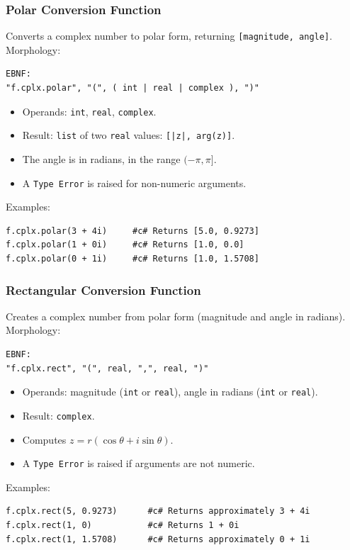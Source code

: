 \subsubsection{Polar Conversion Function}
Converts a complex number to polar form, returning \texttt{[magnitude, angle]}. \\
Morphology:
\begin{verbatim}
EBNF:
"f.cplx.polar", "(", ( int | real | complex ), ")"
\end{verbatim}
\begin{itemize}
\item Operands: \texttt{int}, \texttt{real}, \texttt{complex}.
\item Result: \texttt{list} of two \texttt{real} values: \texttt{[|z|, arg(z)]}.
\item The angle is in radians, in the range $(-\pi, \pi]$.
\item A \texttt{Type Error} is raised for non-numeric arguments.
\end{itemize}
Examples:
\begin{verbatim}
f.cplx.polar(3 + 4i)     #c# Returns [5.0, 0.9273]
f.cplx.polar(1 + 0i)     #c# Returns [1.0, 0.0]
f.cplx.polar(0 + 1i)     #c# Returns [1.0, 1.5708]
\end{verbatim}

\subsubsection{Rectangular Conversion Function}
Creates a complex number from polar form (magnitude and angle in radians). \\
Morphology:
\begin{verbatim}
EBNF:
"f.cplx.rect", "(", real, ",", real, ")"
\end{verbatim}
\begin{itemize}
\item Operands: magnitude (\texttt{int} or \texttt{real}), angle in radians (\texttt{int} or \texttt{real}).
\item Result: \texttt{complex}.
\item Computes $z = r(\cos\theta + i\sin\theta)$.
\item A \texttt{Type Error} is raised if arguments are not numeric.
\end{itemize}
Examples:
\begin{verbatim}
f.cplx.rect(5, 0.9273)      #c# Returns approximately 3 + 4i
f.cplx.rect(1, 0)           #c# Returns 1 + 0i
f.cplx.rect(1, 1.5708)      #c# Returns approximately 0 + 1i
\end{verbatim}

